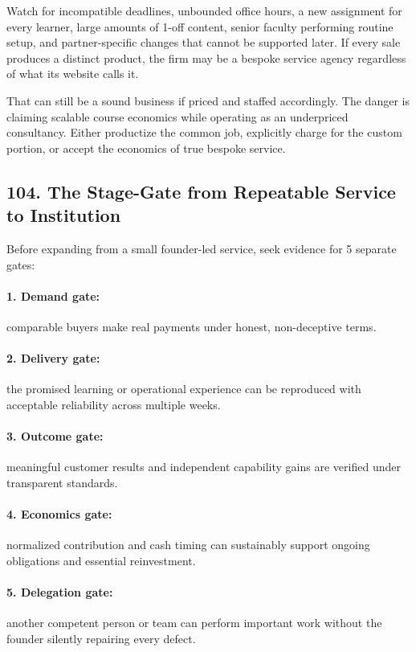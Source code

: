 Watch for incompatible deadlines, unbounded office hours, a new assignment for every learner, large amounts of 1-off content, senior faculty performing routine setup, and partner-specific changes that cannot be supported later. If every sale produces a distinct product, the firm may be a bespoke service agency regardless of what its website calls it.

That can still be a sound business if priced and staffed accordingly. The danger is claiming scalable course economics while operating as an underpriced consultancy. Either productize the common job, explicitly charge for the custom portion, or accept the economics of true bespoke service.

\subsection*{104. The Stage-Gate from Repeatable Service to Institution}

Before expanding from a small founder-led service, seek evidence for 5 separate gates:

\paragraph*{1. Demand gate:} comparable buyers make real payments under honest, non-deceptive terms.

\paragraph*{2. Delivery gate:} the promised learning or operational experience can be reproduced with acceptable reliability across multiple weeks.

\paragraph*{3. Outcome gate:} meaningful customer results and independent capability gains are verified under transparent standards.

\paragraph*{4. Economics gate:} normalized contribution and cash timing can sustainably support ongoing obligations and essential reinvestment.

\paragraph*{5. Delegation gate:} another competent person or team can perform important work without the founder silently repairing every defect.

